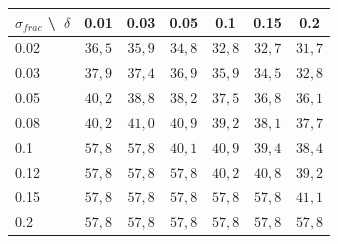 
\begin{tabular}{@{}lcccccc@{}}
\toprule
$\sigma_{frac}$ \textbackslash\ $\delta$ & 0.01 & 0.03 & 0.05 & 0.1 & 0.15 & 0.2 \\
\midrule
0.02 & $36{,}5$ & $35{,}9$ & $34{,}8$ & $32{,}8$ & $32{,}7$ & $31{,}7$ \\
0.03 & $37{,}9$ & $37{,}4$ & $36{,}9$ & $35{,}9$ & $34{,}5$ & $32{,}8$ \\
0.05 & $40{,}2$ & $38{,}8$ & $38{,}2$ & $37{,}5$ & $36{,}8$ & $36{,}1$ \\
0.08 & $40{,}2$ & $41{,}0$ & $40{,}9$ & $39{,}2$ & $38{,}1$ & $37{,}7$ \\
0.1 & $57{,}8$ & $57{,}8$ & $40{,}1$ & $40{,}9$ & $39{,}4$ & $38{,}4$ \\
0.12 & $57{,}8$ & $57{,}8$ & $57{,}8$ & $40{,}2$ & $40{,}8$ & $39{,}2$ \\
0.15 & $57{,}8$ & $57{,}8$ & $57{,}8$ & $57{,}8$ & $57{,}8$ & $41{,}1$ \\
0.2 & $57{,}8$ & $57{,}8$ & $57{,}8$ & $57{,}8$ & $57{,}8$ & $57{,}8$ \\
\bottomrule
\end{tabular}
